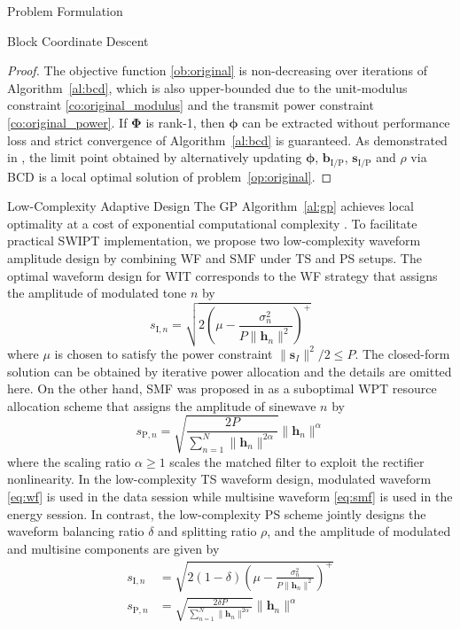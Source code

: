 \documentclass[journal]{IEEEtran}
\begin{document}
\begin{section}{Problem Formulation}
\begin{subsection}{Block Coordinate Descent}
			\begin{proof}\label{pf:bcd}
				The objective function \eqref{ob:original} is non-decreasing over iterations of Algorithm~\ref{al:bcd}, which is also upper-bounded due to the unit-modulus constraint \eqref{co:original_modulus} and the transmit power constraint \eqref{co:original_power}. If $\boldsymbol{\Phi}$ is rank-\num{1}, then $\boldsymbol{\phi}$ can be extracted without performance loss and strict convergence of Algorithm~\ref{al:bcd} is guaranteed. As demonstrated in \cite{Grippo2000}, the limit point obtained by alternatively updating $\boldsymbol{\phi}$, $\boldsymbol{b}_{\mathrm{I/P}}$, $\boldsymbol{s}_{\mathrm{I/P}}$ and $\rho$ via BCD is a local optimal solution of problem~\eqref{op:original}.
			\end{proof}
		\end{subsection}


		\begin{subsection}{Low-Complexity Adaptive Design}
			The GP Algorithm~\ref{al:gp} achieves local optimality at a cost of exponential computational complexity \cite{Chiang2005}. To facilitate practical SWIPT implementation, we propose two low-complexity waveform amplitude design by combining WF and SMF under TS and PS setups. The optimal waveform design for WIT corresponds to the WF strategy that assigns the amplitude of modulated tone $n$ by
			\begin{equation}\label{eq:wf}
				s_{\mathrm{I}, n} = \sqrt{2\left(\mu - \frac{\sigma_n^2}{P \lVert{\boldsymbol{h}_n}\rVert^2}\right)^+}
			\end{equation}
			where $\mu$ is chosen to satisfy the power constraint $\lVert{\boldsymbol{s}_I}\rVert^2 / 2 \le P$. The closed-form solution can be obtained by iterative power allocation \cite{Tse2005} and the details are omitted here. On the other hand, SMF was proposed in \cite{Clerckx2017} as a suboptimal WPT resource allocation scheme that assigns the amplitude of sinewave $n$ by
			\begin{equation}\label{eq:smf}
				s_{\mathrm{P}, n} = \sqrt{\frac{2 P}{\sum_{n=1}^N \lVert{\boldsymbol{h}_n \rVert^{2 \alpha}}}}\lVert{\boldsymbol{h}_n}\rVert^\alpha
			\end{equation}
			where the scaling ratio $\alpha \ge 1$ scales the matched filter to exploit the rectifier nonlinearity. In the low-complexity TS waveform design, modulated waveform \eqref{eq:wf} is used in the data session while multisine waveform \eqref{eq:smf} is used in the energy session. In contrast, the low-complexity PS scheme jointly designs the waveform balancing ratio $\delta$ and splitting ratio $\rho$, and the amplitude of modulated and multisine components are given by
			\begin{align}
				s_{\mathrm{I}, n} &= \sqrt{2(1 - \delta)\left(\mu - \frac{\sigma_n^2}{P \lVert{\boldsymbol{h}_n}\rVert^2}\right)^+} \label{eq:s_i}\\
				s_{\mathrm{P}, n} &= \sqrt{\frac{2 \delta P}{\sum_{n=1}^N \lVert{\boldsymbol{h}_n \rVert^{2 \alpha}}}}\lVert{\boldsymbol{h}_n}\rVert^\alpha \label{eq:s_p}
			\end{align}


\end{subsection}
\end{section}
\end{document}
